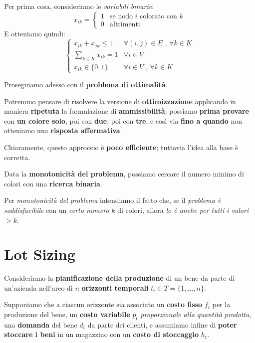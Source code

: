 Per prima cosa, consideriamo le \textit{variabili binarie}:
\[
    x_{ik} = \begin{cases}
    1 & \text{se nodo } i \text{ colorato con } k \\ 
    0 & \text{altrimenti}
    \end{cases}
\]
E otteniamo quindi:
\[
    \begin{cases}
        x_{ik} + x_{jk} \le 1 & \forall (i,j) \in E \text{ , } \forall k \in K \\ 
        \displaystyle\sum_{k\in K} x_{ik} = 1 & \forall i \in V \\ 
        x_{ik} \in \{0,1\} & \forall i \in V \text{ , } \forall k \in K
    \end{cases}
\]

Proseguiamo adesso con il \textbf{problema di ottimalità}.

\begin{remark}
    Potremmo pensare di risolvere la versione di \textbf{ottimizzazione}
    applicando in maniera \textbf{ripetuta} la formulazione di \textbf{ammissibilità}:
    possiamo \textbf{prima provare} con \textbf{un colore solo}, poi con \textbf{due},
    poi con \textbf{tre}, e così via \textbf{fino a quando} non otteniamo una
    \textbf{risposta affermativa}.
\end{remark}

Chiaramente, questo approccio è \textbf{poco efficiente}; tuttavia l'idea
alla base è corretta.

\begin{remark}
    Data la \textbf{monotonicità del problema}, possiamo cercare il numero minimo 
    di colori con una \textbf{ricerca binaria}.
\end{remark}

Per \textit{monotonicità del problema} intendiamo il fatto che, se il 
\textit{problema è soddisfacibile} con un \textit{certo numero} $k$ di colori, 
allora \textit{lo è anche per tutti i valori} $>k$.

\section{Lot Sizing}

Consideriamo la \textbf{pianificazione della produzione} di un bene da parte di un'azienda
nell'arco di $n$ \textbf{orizzonti temporali} $t_i \in T= \{ 1,\ldots ,n \}$.

Supponiamo che a ciascun orizzonte sia associato un \textbf{costo fisso} $f_t$ per la 
produzione del bene, un \textbf{costo variabile} $p_t$ \textit{proporzionale alla quantità prodotta}, 
una \textbf{domanda} del bene $d_t$ da parte dei clienti, e assumiamo infine di 
\textbf{poter stoccare i beni} in un magazzino con un \textbf{costo di stoccaggio} $h_t$.


